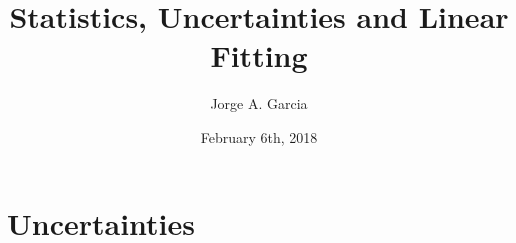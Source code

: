 \documentclass{article}
\title{Statistics, Uncertainties and Linear Fitting}
\author{Jorge A. Garcia}
\date{February 6th, 2018}
\begin{document}
 \maketitle
 
 \section{Uncertainties}
 
 
 
\end{document}
